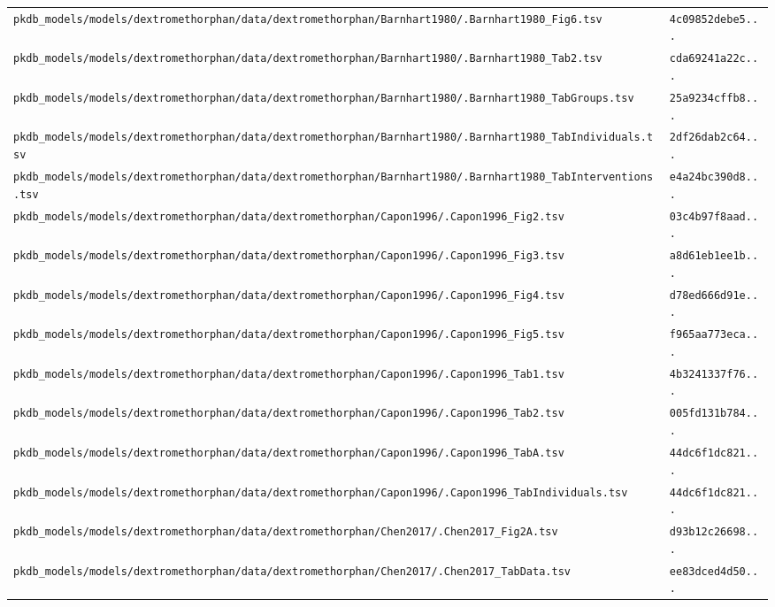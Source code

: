 \documentclass{article}
\begin{document}
\begin{longtable}{ll}
\texttt{pkdb\_models/models/dextromethorphan/data/dextromethorphan/Barnhart1980/.Barnhart1980\_Fig6.tsv} & \texttt{4c09852debe5...} \\
\texttt{pkdb\_models/models/dextromethorphan/data/dextromethorphan/Barnhart1980/.Barnhart1980\_Tab2.tsv} & \texttt{cda69241a22c...} \\
\texttt{pkdb\_models/models/dextromethorphan/data/dextromethorphan/Barnhart1980/.Barnhart1980\_TabGroups.tsv} & \texttt{25a9234cffb8...} \\
\texttt{pkdb\_models/models/dextromethorphan/data/dextromethorphan/Barnhart1980/.Barnhart1980\_TabIndividuals.tsv} & \texttt{2df26dab2c64...} \\
\texttt{pkdb\_models/models/dextromethorphan/data/dextromethorphan/Barnhart1980/.Barnhart1980\_TabInterventions.tsv} & \texttt{e4a24bc390d8...} \\
\texttt{pkdb\_models/models/dextromethorphan/data/dextromethorphan/Capon1996/.Capon1996\_Fig2.tsv} & \texttt{03c4b97f8aad...} \\
\texttt{pkdb\_models/models/dextromethorphan/data/dextromethorphan/Capon1996/.Capon1996\_Fig3.tsv} & \texttt{a8d61eb1ee1b...} \\
\texttt{pkdb\_models/models/dextromethorphan/data/dextromethorphan/Capon1996/.Capon1996\_Fig4.tsv} & \texttt{d78ed666d91e...} \\
\texttt{pkdb\_models/models/dextromethorphan/data/dextromethorphan/Capon1996/.Capon1996\_Fig5.tsv} & \texttt{f965aa773eca...} \\
\texttt{pkdb\_models/models/dextromethorphan/data/dextromethorphan/Capon1996/.Capon1996\_Tab1.tsv} & \texttt{4b3241337f76...} \\
\texttt{pkdb\_models/models/dextromethorphan/data/dextromethorphan/Capon1996/.Capon1996\_Tab2.tsv} & \texttt{005fd131b784...} \\
\texttt{pkdb\_models/models/dextromethorphan/data/dextromethorphan/Capon1996/.Capon1996\_TabA.tsv} & \texttt{44dc6f1dc821...} \\
\texttt{pkdb\_models/models/dextromethorphan/data/dextromethorphan/Capon1996/.Capon1996\_TabIndividuals.tsv} & \texttt{44dc6f1dc821...} \\
\texttt{pkdb\_models/models/dextromethorphan/data/dextromethorphan/Chen2017/.Chen2017\_Fig2A.tsv} & \texttt{d93b12c26698...} \\
\texttt{pkdb\_models/models/dextromethorphan/data/dextromethorphan/Chen2017/.Chen2017\_TabData.tsv} & \texttt{ee83dced4d50...} \\

\end{longtable}
\end{document}
